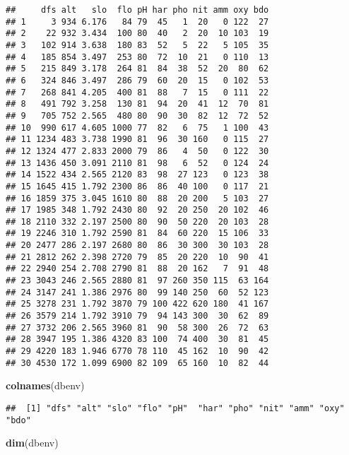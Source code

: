 \documentclass[
]{book}
\newenvironment{Shaded}{\begin{snugshade}}{\end{snugshade}}
\newcommand{\KeywordTok}[1]{\textcolor[rgb]{0.13,0.29,0.53}{\textbf{#1}}}
\newcommand{\NormalTok}[1]{#1}
\begin{document}
\begin{verbatim}
##     dfs alt   slo  flo pH har pho nit amm oxy bdo
## 1     3 934 6.176   84 79  45   1  20   0 122  27
## 2    22 932 3.434  100 80  40   2  20  10 103  19
## 3   102 914 3.638  180 83  52   5  22   5 105  35
## 4   185 854 3.497  253 80  72  10  21   0 110  13
## 5   215 849 3.178  264 81  84  38  52  20  80  62
## 6   324 846 3.497  286 79  60  20  15   0 102  53
## 7   268 841 4.205  400 81  88   7  15   0 111  22
## 8   491 792 3.258  130 81  94  20  41  12  70  81
## 9   705 752 2.565  480 80  90  30  82  12  72  52
## 10  990 617 4.605 1000 77  82   6  75   1 100  43
## 11 1234 483 3.738 1990 81  96  30 160   0 115  27
## 12 1324 477 2.833 2000 79  86   4  50   0 122  30
## 13 1436 450 3.091 2110 81  98   6  52   0 124  24
## 14 1522 434 2.565 2120 83  98  27 123   0 123  38
## 15 1645 415 1.792 2300 86  86  40 100   0 117  21
## 16 1859 375 3.045 1610 80  88  20 200   5 103  27
## 17 1985 348 1.792 2430 80  92  20 250  20 102  46
## 18 2110 332 2.197 2500 80  90  50 220  20 103  28
## 19 2246 310 1.792 2590 81  84  60 220  15 106  33
## 20 2477 286 2.197 2680 80  86  30 300  30 103  28
## 21 2812 262 2.398 2720 79  85  20 220  10  90  41
## 22 2940 254 2.708 2790 81  88  20 162   7  91  48
## 23 3043 246 2.565 2880 81  97 260 350 115  63 164
## 24 3147 241 1.386 2976 80  99 140 250  60  52 123
## 25 3278 231 1.792 3870 79 100 422 620 180  41 167
## 26 3579 214 1.792 3910 79  94 143 300  30  62  89
## 27 3732 206 2.565 3960 81  90  58 300  26  72  63
## 28 3947 195 1.386 4320 83 100  74 400  30  81  45
## 29 4220 183 1.946 6770 78 110  45 162  10  90  42
## 30 4530 172 1.099 6900 82 109  65 160  10  82  44
\end{verbatim}

\begin{Shaded}
\begin{Highlighting}[]
\KeywordTok{colnames}\NormalTok{(dbenv)}
\end{Highlighting}
\end{Shaded}

\begin{verbatim}
##  [1] "dfs" "alt" "slo" "flo" "pH"  "har" "pho" "nit" "amm" "oxy" "bdo"
\end{verbatim}

\begin{Shaded}
\begin{Highlighting}[]
\KeywordTok{dim}\NormalTok{(dbenv)}
\end{Highlighting}
\end{Shaded}
\end{document}
